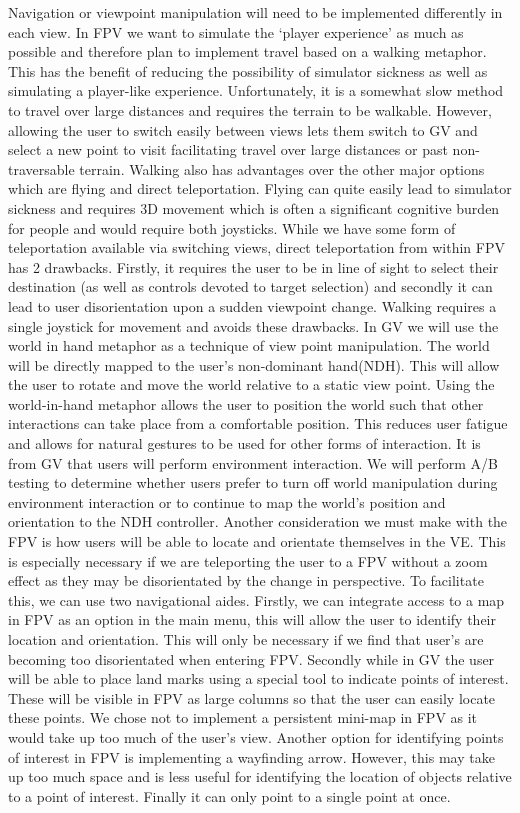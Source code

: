 \documentclass{sig-alternate-05-2015}
\begin{document}
Navigation or viewpoint manipulation will need to be implemented differently in each view. In FPV we want to simulate the `player experience' as much as possible and therefore plan to implement travel based on a walking metaphor. This has the benefit of reducing the possibility of simulator sickness as well as simulating a player-like experience. Unfortunately, it is a somewhat slow method to travel over large distances and requires the terrain to be walkable. However, allowing the user to switch easily between views lets them switch to GV and select a new point to visit facilitating travel over large distances or past non-traversable terrain. Walking also has advantages over the other major options which are flying and direct teleportation. Flying can quite easily lead to simulator sickness and requires 3D movement which is often a significant cognitive burden for people and would require both joysticks. While we have some form of teleportation available via switching views, direct teleportation from within FPV has 2 drawbacks. Firstly, it requires the user to be in line of sight to select their destination (as well as controls devoted to target selection) and secondly it can lead to user disorientation upon a sudden viewpoint change. Walking requires a single joystick for movement and avoids these drawbacks. 
In GV we will use the world in hand metaphor as a technique of view point manipulation. The world will be directly mapped to the user's non-dominant hand(NDH). This will allow the user to rotate and move the world relative to a static view point. Using the world-in-hand metaphor allows the user to position the world such that other interactions can take place from a comfortable position. This reduces user fatigue and allows for natural gestures to be used for other forms of interaction. It is from GV that users will perform environment interaction. We will perform A/B testing to determine whether users prefer to turn off world manipulation during environment interaction or to continue to map the world's position and orientation to the NDH controller.
Another consideration we must make with the FPV is how users will be able to locate and orientate themselves in the VE. This is especially necessary if we are teleporting the user to a FPV without a zoom effect as they may be disorientated by the change in perspective. To facilitate this, we can use two navigational aides. Firstly, we can integrate access to a map in FPV as an option in the main menu, this will allow the user to identify their location and orientation. This will only be necessary if we find that user's are becoming too disorientated when entering FPV. Secondly while in GV the user will be able to place land marks using a special tool to indicate points of interest. These will be visible in FPV as large columns so that the user can easily locate these points. We chose not to implement a persistent mini-map in FPV as it would take up too much of the user's view. Another option for identifying points of interest in FPV is implementing a wayfinding arrow. However, this may take up too much space and is less useful for identifying the location of objects relative to a point of interest. Finally it can only point to a single point at once.
\end{document}
